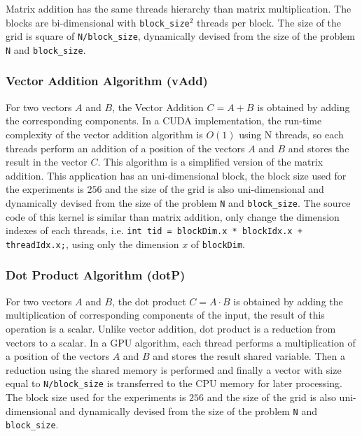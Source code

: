 Matrix addition has the same threads hierarchy than matrix multiplication. The blocks are bi-dimensional with \texttt{block\_size}$^2$ threads per block. The size of the grid is square of \texttt{N/block\_size}, dynamically devised from the size of the problem \texttt{N} and \texttt{block\_size}.

\subsubsection{Vector Addition Algorithm (vAdd)}
For two vectors $A$ and $B$, the Vector Addition $C = A + B$ is obtained by adding the corresponding components. In a CUDA implementation, the run-time complexity of the vector addition algorithm is $O(1)$ using N threads, so each threads perform an addition of a position of the vectors $A$ and $B$ and stores the result in the vector $C$. This algorithm is a simplified version of the matrix addition. This application has an uni-dimensional block, the block size used for the experiments is $256$ and the size of the grid is also uni-dimensional and dynamically devised from the size of the problem  \texttt{N} and \texttt{block\_size}. The source code of this kernel is similar than matrix addition, only change the dimension indexes of each threads, i.e. \texttt{int tid = blockDim.x * blockIdx.x + threadIdx.x;}, using only the dimension $x$ of \texttt{blockDim}.

\subsubsection{Dot Product Algorithm (dotP)}
For two vectors $A$ and $B$, the dot product $C = A \cdot B$ is obtained by adding the multiplication of corresponding components of the input, the result of this operation is a scalar. Unlike vector addition, dot product is a reduction from vectors to a scalar. In a GPU algorithm, each thread performs a multiplication of a position of the vectors $A$ and $B$ and stores the result shared variable. Then a reduction using the shared memory is performed and finally a vector with size equal to \texttt{N/block\_size} is transferred to the CPU memory for later processing. The block size used for the experiments is $256$ and the size of the grid is also uni-dimensional and dynamically devised from the size of the problem  \texttt{N} and \texttt{block\_size}.

